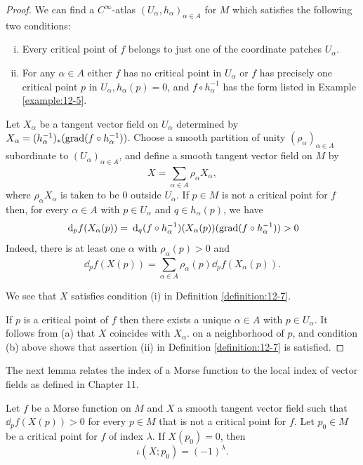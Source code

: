 \begin{proof}
We can find a $C^\infty$-atlas $(U_\alpha, h_\alpha)_{\alpha\in A}$ for $M$ which satisfies the following two conditions:
\begin{enumerate}[(i)]
  \item Every critical point of $f$ belongs to just one of the coordinate patches $U_\alpha$.
  \item For any $\alpha\in A$ either $f$ has no critical point in $U_\alpha$ or $f$ has precisely
    one critical point $p$ in $U_\alpha, h_\alpha(p) = 0$, and $f\circ h_\alpha^{-1}$ has the form 
    listed in Example \ref{example:12-5}.
\end{enumerate}

Let $X_\alpha$ be a tangent vector field on $U_\alpha$ determined by $X_\alpha = (h^{-1}_\alpha)_*(\operatorname{grad} (f\circ h_\alpha^{-1}))$.
Choose a smooth partition of unity $(\rho_\alpha)_{\alpha\in A}$ subordinate to $(U_\alpha)_{\alpha\in A}$, and define a smooth 
tangent vector field on $M$ by
\[
  X = \sum_{\alpha\in A}^{}{\rho_\alpha X_\alpha},
\]
where $\rho_\alpha X_\alpha$ is taken to be 0 outside $U_\alpha$. If $p\in M$ is not a critical point for $f$ then, for 
every $\alpha\in A$ with $p\in U_\alpha$ and $q\in h_\alpha(p)$, we have 
\[
  \dd_pf(X_\alpha(p)) 
  = \dd_q(f\circ h_\alpha^{-1})(X_\alpha(p))(\grad (f\circ h_\alpha^{-1})) > 0
\]
Indeed, there is at least one $\alpha$ with $\rho_\alpha(p)>0$ and 
\[
  \dd_pf(X(p)) = \sum_{\alpha\in A}^{}\rho_\alpha(p)\dd_pf(X_\alpha(p)).
\]

We see that $X$ satisfies condition (i) in Definition \ref{definition:12-7}.

If $p$ is a critical point of $f$ then there exists a unique $\alpha\in A$ with $p\in U_\alpha$. It
follows from (a) that $X$ coincides with $X_\alpha$. on a neighborhood of $p$, and condition
(b) above shows that assertion (ii) in Definition \ref{definition:12-7} is satisfied.
\end{proof}

The next lemma relates the index of a Morse function to the local index of vector
fields as defined in Chapter 11.

\begin{lemma}\label{lemma:12-9}
  Let $f$ be a Morse function on $M$ and $X$ a smooth tangent vector
field such that $\dd_pf(X(p)) > 0$ for every $p\in M$ that is not a critical point for $f$.
Let $p_0\in M$ be a critical point for $f$ of index $\lambda$. If $X(p_0) = 0$, then
\[
  \iota(X; p_0) = (-1)^\lambda.
\]
\end{lemma}

